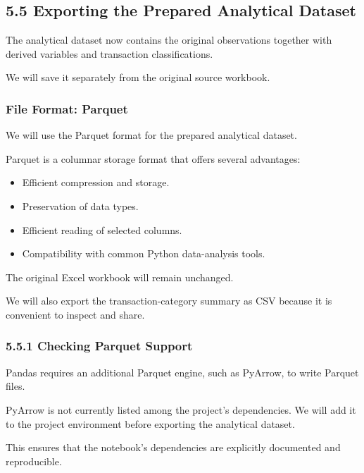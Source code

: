 \documentclass[11pt]{article}
\providecommand{\tightlist}{%
      \setlength{\itemsep}{0pt}\setlength{\parskip}{0pt}}
\begin{document}
    
    \subsection{5.5 Exporting the Prepared Analytical
Dataset}\label{exporting-the-prepared-analytical-dataset}

The analytical dataset now contains the original observations together
with derived variables and transaction classifications.

We will save it separately from the original source workbook.

\subsubsection{File Format: Parquet}\label{file-format-parquet}

We will use the Parquet format for the prepared analytical dataset.

Parquet is a columnar storage format that offers several advantages:

\begin{itemize}
\tightlist
\item
  Efficient compression and storage.
\item
  Preservation of data types.
\item
  Efficient reading of selected columns.
\item
  Compatibility with common Python data-analysis tools.
\end{itemize}

The original Excel workbook will remain unchanged.

We will also export the transaction-category summary as CSV because it
is convenient to inspect and share.

    \subsubsection{5.5.1 Checking Parquet
Support}\label{checking-parquet-support}

Pandas requires an additional Parquet engine, such as PyArrow, to write
Parquet files.

PyArrow is not currently listed among the project's dependencies. We
will add it to the project environment before exporting the analytical
dataset.

This ensures that the notebook's dependencies are explicitly documented
and reproducible.
\end{document}
